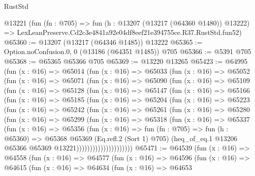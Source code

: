 \begin{lexlean}{RustStd}
\begin{coremodule}
    @13221
    (fun (fn : @705) =>
    fun (h : @13207 (@13217 (@64360 @1480)) @13222) =>
    LexLeanPreserve.Cd2c3e4841a92e04df8eef21e394755ce.R37.RustStd.fun52)
@65360 := @13207 (@13217 (@64346 @1485)) @13222
@65365 := Option.noConfusion.{0, 0} (@13186 (@64351 @1485)) @705
@65366 := @5391 @705
@65368 := @65365 @65366 @705
@65369 := @13220 @13265
@65423 := @64995
    (fun (x : @16) =>
    @65014
      (fun (x : @16) =>
      @65033
        (fun (x : @16) =>
        @65052
          (fun (x : @16) =>
          @65071
            (fun (x : @16) =>
            @65090
              (fun (x : @16) =>
              @65109
                (fun (x : @16) =>
                @65128
                  (fun (x : @16) =>
                  @65147
                    (fun (x : @16) =>
                    @65166
                      (fun (x : @16) =>
                      @65185
                        (fun (x : @16) =>
                        @65204
                          (fun (x : @16) =>
                          @65223
                            (fun (x : @16) =>
                            @65242
                              (fun (x : @16) =>
                              @65261
                                (fun (x : @16) =>
                                @65280
                                  (fun (x : @16) =>
                                  @65299
                                    (fun (x : @16) =>
                                    @65318
                                      (fun (x : @16) =>
                                      @65337
                                        (fun (x : @16) =>
                                        @65356
                                          (fun (x : @16) =>
                                          fun (fn : @705) =>
                                          fun (h : @65360) =>
                                          @65368
                                            @65369
                                            (Eq.refl.{2} (Sort 1) @705)
                                            (heq_of_eq.{1}
                                              @13206
                                              @65366
                                              @65369
                                              @13221)))))))))))))))))))))
@65471 := @64539
    (fun (x : @16) =>
    @64558
      (fun (x : @16) =>
      @64577
        (fun (x : @16) =>
        @64596
          (fun (x : @16) =>
          @64615
            (fun (x : @16) =>
            @64634
              (fun (x : @16) =>
              @64653

\end{coremodule}
\end{lexlean}
